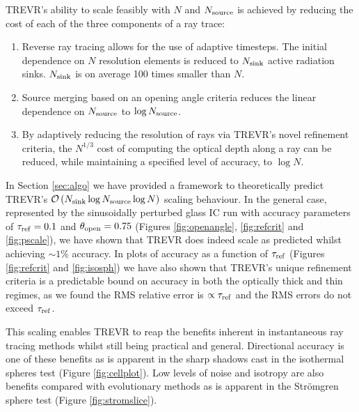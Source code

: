 \documentclass[fleq,usenatbib]{mnras}
\newcommand{\acro}{TREVR}
\newcommand{\bigO}[1]{\mathcal{O}\left(#1\right)}
\newcommand{\NS}{N_{\rm source}}
\newcommand{\NK}{N_{\rm sink}}
\newcommand{\tr}{\tau_{\rm ref}}
\newcommand{\tO}{\theta_{\rm open}}
\newcommand{\strom}{Str\"omgren}
\begin{document}
{\acro{}'s ability to scale feasibly with $N$ and $\NS$ is achieved by reducing 
the cost of each of the three components of a ray trace:
\begin{enumerate}
\item Reverse ray tracing allows for the use of adaptive timesteps. The 
initial dependence on $N$ resolution elements is reduced to $\NK$ active 
radiation sinks. $\NK$ is on average 100 times smaller than $N$.
\item Source merging based on an opening angle criteria reduces the linear 
dependence on $\NS$ to $\log\NS$.
\item By adaptively reducing the resolution of rays via \acro{}'s novel 
refinement criteria, the $N^{1/3}$ cost of computing the optical depth along a 
ray can be reduced, while maintaining a specified level of accuracy, to 
$\log N$.
\end{enumerate}
In Section \ref{sec:algo} we have provided a framework to theoretically 
predict \acro{}'s $\bigO{\NK \log\NS \log N}$ scaling behaviour. In the 
general case, represented by the sinusoidally perturbed glass IC run with 
accuracy parameters of $\tr=0.1$ and $\tO=0.75$ (Figures \ref{fig:openangle}, 
\ref{fig:refcrit} and \ref{fig:pscale}), we have shown that \acro{} does 
indeed scale as predicted whilst achieving $\sim 1\%$ accuracy. In plots of 
accuracy as a function of $\tr$ (Figures \ref{fig:refcrit} and 
\ref{fig:isosph}) we have also shown that \acro{}'s unique refinement criteria 
is a predictable bound on accuracy in both the optically thick and thin 
regimes, as we found the RMS relative error is $\propto \tr$ and the RMS 
errors do not exceed $\tr$.

This scaling enables \acro{} to reap the benefits inherent in instantaneous 
ray tracing methods whilst still being practical and general. Directional 
accuracy is one of these benefits as is apparent in the sharp shadows cast 
in the isothermal spheres test (Figure \ref{fig:cellplot}). Low levels of 
noise and isotropy are also benefits compared with evolutionary methods as is 
apparent in the \strom{} sphere test (Figure \ref{fig:stromslice}).

}
\end{document}
